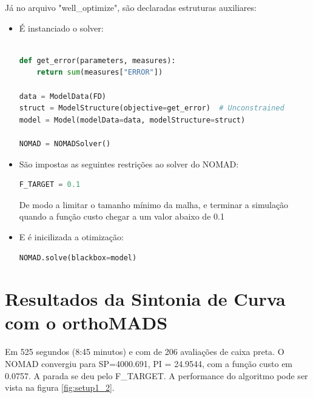 Já no arquivo "well\_optimize", são declaradas estruturas auxiliares:
\begin{itemize}

\item É instanciado o solver:
\begin{lstlisting}[language=Python]%

def get_error(parameters, measures):
    return sum(measures["ERROR"])

data = ModelData(FD)
struct = ModelStructure(objective=get_error)  # Unconstrained
model = Model(modelData=data, modelStructure=struct)

NOMAD = NOMADSolver()

\end{lstlisting}



\item São impostas as seguintes restrições ao solver do NOMAD:
\begin{lstlisting}[language=Python]
F_TARGET = 0.1
\end{lstlisting}

De modo a limitar o tamanho mínimo da malha, e terminar a simulação quando a função custo chegar a um valor abaixo de 0.1

\item E é inicilizada a otimização:
\begin{lstlisting}[language=Python]
NOMAD.solve(blackbox=model)
\end{lstlisting}

\end{itemize}

\section{Resultados da Sintonia de Curva com o orthoMADS}

Em 525 segundos (8:45 minutos) e com de 206 avaliações de caixa preta. O NOMAD convergiu para SP=4000.691, PI = 24.9544, com a função custo em 0.0757. A parada se deu pelo F\_TARGET. A performance do algoritmo pode ser vista na figura \ref{fig:setup1_2}.


